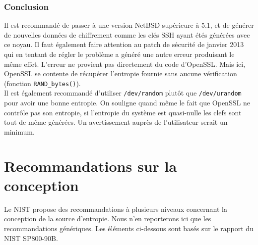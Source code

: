		\subsubsection{Conclusion}
			
			Il est recommandé de passer à une version NetBSD supérieure à 5.1, et de générer de nouvelles données de chiffrement comme les clés SSH ayant étés générées avec ce noyau. Il faut également faire attention au patch de sécurité de janvier 2013 qui en tentant de régler le problème a généré une autre erreur produisant le même effet.	L'erreur ne provient pas directement du code d'OpenSSL. Mais ici, OpenSSL se contente de récupérer l'entropie fournie sans aucune vérification (fonction \texttt{RAND\_bytes()}).\\ 

			Il est également recommandé d'utiliser \texttt{/dev/random} plutôt que \texttt{/dev/urandom} pour avoir une bonne entropie. On souligne quand même le fait que OpenSSL ne contrôle pas son entropie, si l'entropie du système est quasi-nulle les clefs sont tout de même générées. Un avertissement auprès de l'utilisateur serait un minimum.
			
\section{Recommandations sur la conception}
Le NIST propose des recommandations à plusieurs niveaux concernant la conception de la source d'entropie. Nous n'en reporterons ici que les recommandations génériques. Les éléments ci-dessous sont basés sur le rapport du NIST SP800-90B.

